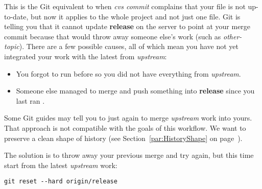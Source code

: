 \begin{figure}
\centering
{}
\label{fig:UnreachableBranch}
\end{figure}

This is the Git equivalent to when \textit{cvs commit} complains that your file
is not up-to-date, but now it applies to the whole project and not just one
file. Git is telling you that it cannot update \textbf{release} on the server to
point at your merge commit because that would throw away someone else's work
(such as \textit{other-topic}). There are a few possible causes, all of which
mean you have not yet integrated your work with the latest from
\textit{upstream}:
\begin{itemize}
\item You forgot to run  before  so you did not
have everything from \textit{upstream}.
\item Someone else managed to merge and push something into \textbf{release}
since you last ran .
\end{itemize}

Some Git guides may tell you to just  again to merge
\textit{upstream} work into yours. That approach is not compatible with the goals
of this workflow. We want to preserve a clean shape of history (see
Section~\ref{par:HistoryShape} on page~\pageref{par:HistoryShape}).

The solution is to throw away your previous merge and try again, but this time
start from the latest \textit{upstream} work:

\begin{verbatim}
git reset --hard origin/release
\end{verbatim}

